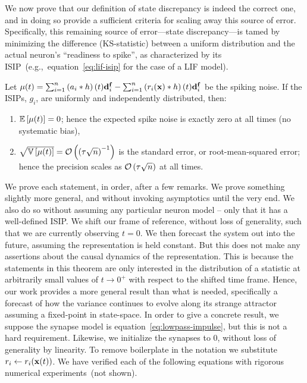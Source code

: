 We now prove that our definition of state discrepancy is indeed the correct one, and in doing so provide a sufficient criteria for scaling away this source of error.
Specifically, this remaining source of error---state discrepancy---is tamed by minimizing the difference (KS-statistic) between a uniform distribution and the actual neuron's ``readiness to spike'', as characterized by its ISIP~(e.g.,~equation~\ref{eq:lif-isip} for the case of a LIF model).

\vspace{1em}

\begin{theorem}
\label{thm:correctness}
Let $\mathbf{\mu}(t) = \sum_{i=1}^n \left(a_i \ast h \right)(t) \mathbf{d}^{\mathbf{f}}_i- \sum_{i=1}^n \left( r_i(\mathbf{x}) \ast h \right)(t) \mathbf{d}^{\mathbf{f}}_i$
be the spiking noise.
If the ISIPs, $g_i$, are uniformly and independently distributed, then:
\begin{enumerate}
\item $\mathbb{E}\left[{ \mathbf{\mu}(t) }\right] = 0$; hence the expected spike noise is exactly zero at all times (no systematic bias), 
\item $\sqrt{\mathbb{V}\left[{\mathbf{\mu}(t)}\right]} = \mathcal{O}\left({\left(\tau \sqrt{n}\right)^{-1}}\right)$ is the standard error, or root-mean-squared error; hence the precision scales as $\mathcal{O}\left({ \tau \sqrt{n} }\right)$ at all times.
\end{enumerate}
\end{theorem}
We prove each statement, in order, after a few remarks.
We prove something slightly more general, and without invoking asymptotics until the very end.
We also do so without assuming any particular neuron model -- only that it has a well-defined ISIP.
We shift our frame of reference, without loss of generality, such that we are currently observing $t = 0$.
We then forecast the system out into the future, assuming the representation is held constant.
But this does not make any assertions about the causal dynamics of the representation.
This is because the statements in this theorem are only interested in the distribution of a statistic at arbitrarily small values of $t \rightarrow 0^+$ with respect to the shifted time frame.
Hence, our work provides a more general result than what is needed, specifically a forecast of how the variance continues to evolve along its strange attractor assuming a fixed-point in state-space.
In order to give a concrete result, we suppose the synapse model is equation~\ref{eq:lowpass-impulse}, but this is not a hard requirement.
Likewise, we initialize the synapses to $0$, without loss of generality by linearity.
To remove boilerplate in the notation we substitute $r_i \leftarrow r_i(\mathbf{x}(t))$.
We have verified each of the following equations with rigorous numerical experiments~(not shown).

